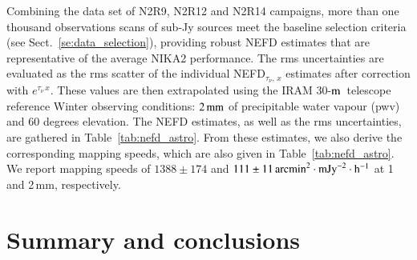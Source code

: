 \documentclass[traditionalabstract]{aa}
\newcommand{\trentemetre}{30-$\rm{m}$}
\newcommand{\taunu}{\tau_{\nu}}
\begin{document}
Combining the data set of N2R9, N2R12 and N2R14 campaigns, more than one
thousand observations scans of sub-Jy sources meet the baseline selection
criteria (see Sect.~\ref{se:data_selection}), providing robust NEFD estimates
that are representative of the average NIKA2 performance. The rms
uncertainties are evaluated as the rms scatter of the individual
NEFD$_{\taunu,\, x}$ estimates after correction with
$e^{\taunu\,x}$. 
These values are then extrapolated using the IRAM
\trentemetre\ telescope reference Winter observing conditions: $2\,\rm{mm}$ of
precipitable water vapour (pwv) and $60$ degrees elevation. The NEFD
estimates, as well as the rms uncertainties, are gathered in
Table~\ref{tab:nefd_astro}.
From these estimates, we also derive the corresponding mapping speeds,
which are also given in Table~\ref{tab:nefd_astro}.
We report mapping speeds of $1388 \pm 174$ and
$111 \pm 11 \, \rm{arcmin}^2\cdot \rm{mJy}^{-2}\cdot \rm{h}^{-1}$ at 1
and 2\,mm, respectively. 




\section{Summary and conclusions}
\label{se:summary}
\end{document}
